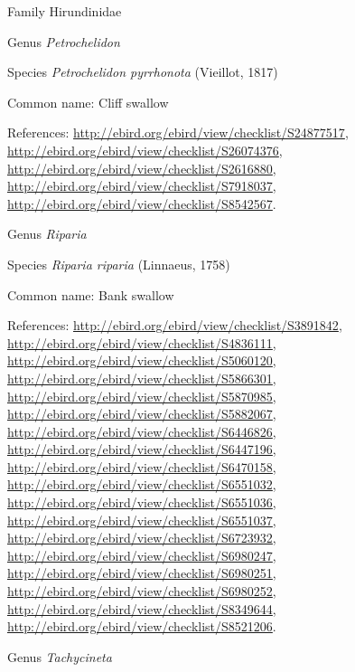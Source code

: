 \documentclass[9pt, article]{memoir}
\begin{document}
\begin{multicols}{2}
\vspace{6pt}\noindent\hspace{24pt}Family Hirundinidae


\vspace{6pt}\noindent\hspace{30pt}Genus \textit{Petrochelidon}


\vspace{6pt}\noindent\hspace{36pt}Species \textit{Petrochelidon pyrrhonota} (Vieillot, 1817)


Common name: Cliff swallow

References: 
\url{http://ebird.org/ebird/view/checklist/S24877517}, 
\url{http://ebird.org/ebird/view/checklist/S26074376}, 
\url{http://ebird.org/ebird/view/checklist/S2616880}, 
\url{http://ebird.org/ebird/view/checklist/S7918037}, 
\url{http://ebird.org/ebird/view/checklist/S8542567}.

\vspace{6pt}\noindent\hspace{30pt}Genus \textit{Riparia}


\vspace{6pt}\noindent\hspace{36pt}Species \textit{Riparia riparia} (Linnaeus, 1758)


Common name: Bank swallow

References: 
\url{http://ebird.org/ebird/view/checklist/S3891842}, 
\url{http://ebird.org/ebird/view/checklist/S4836111}, 
\url{http://ebird.org/ebird/view/checklist/S5060120}, 
\url{http://ebird.org/ebird/view/checklist/S5866301}, 
\url{http://ebird.org/ebird/view/checklist/S5870985}, 
\url{http://ebird.org/ebird/view/checklist/S5882067}, 
\url{http://ebird.org/ebird/view/checklist/S6446826}, 
\url{http://ebird.org/ebird/view/checklist/S6447196}, 
\url{http://ebird.org/ebird/view/checklist/S6470158}, 
\url{http://ebird.org/ebird/view/checklist/S6551032}, 
\url{http://ebird.org/ebird/view/checklist/S6551036}, 
\url{http://ebird.org/ebird/view/checklist/S6551037}, 
\url{http://ebird.org/ebird/view/checklist/S6723932}, 
\url{http://ebird.org/ebird/view/checklist/S6980247}, 
\url{http://ebird.org/ebird/view/checklist/S6980251}, 
\url{http://ebird.org/ebird/view/checklist/S6980252}, 
\url{http://ebird.org/ebird/view/checklist/S8349644}, 
\url{http://ebird.org/ebird/view/checklist/S8521206}.

\vspace{6pt}\noindent\hspace{30pt}Genus \textit{Tachycineta}



\end{multicols}
\end{document}
